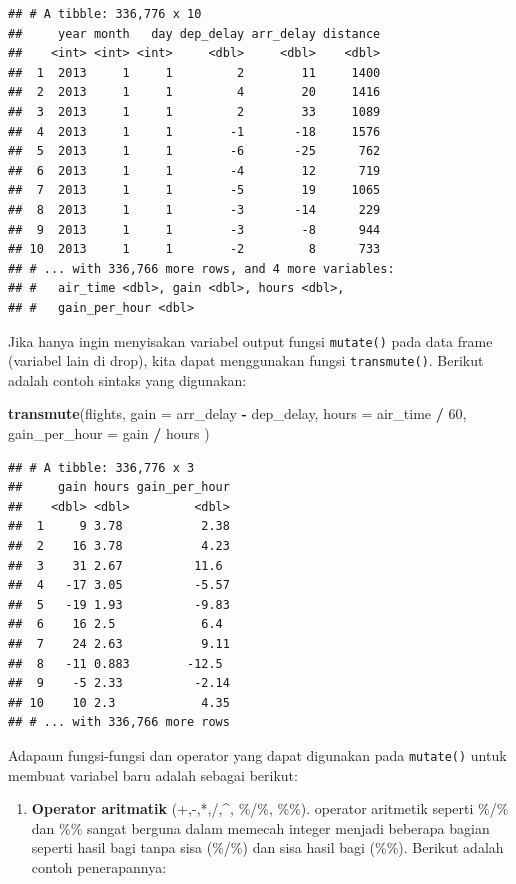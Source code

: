 \documentclass[]{book}
\newenvironment{Shaded}{\begin{snugshade}}{\end{snugshade}}
\newcommand{\KeywordTok}[1]{\textcolor[rgb]{0.13,0.29,0.53}{\textbf{#1}}}
\newcommand{\DataTypeTok}[1]{\textcolor[rgb]{0.13,0.29,0.53}{#1}}
\newcommand{\DecValTok}[1]{\textcolor[rgb]{0.00,0.00,0.81}{#1}}
\newcommand{\StringTok}[1]{\textcolor[rgb]{0.31,0.60,0.02}{#1}}
\newcommand{\OperatorTok}[1]{\textcolor[rgb]{0.81,0.36,0.00}{\textbf{#1}}}
\newcommand{\NormalTok}[1]{#1}
\providecommand{\tightlist}{%
  \setlength{\itemsep}{0pt}\setlength{\parskip}{0pt}}
\begin{document}
\begin{verbatim}
## # A tibble: 336,776 x 10
##     year month   day dep_delay arr_delay distance
##    <int> <int> <int>     <dbl>     <dbl>    <dbl>
##  1  2013     1     1         2        11     1400
##  2  2013     1     1         4        20     1416
##  3  2013     1     1         2        33     1089
##  4  2013     1     1        -1       -18     1576
##  5  2013     1     1        -6       -25      762
##  6  2013     1     1        -4        12      719
##  7  2013     1     1        -5        19     1065
##  8  2013     1     1        -3       -14      229
##  9  2013     1     1        -3        -8      944
## 10  2013     1     1        -2         8      733
## # ... with 336,766 more rows, and 4 more variables:
## #   air_time <dbl>, gain <dbl>, hours <dbl>,
## #   gain_per_hour <dbl>
\end{verbatim}

Jika hanya ingin menyisakan variabel output fungsi \texttt{mutate()}
pada data frame (variabel lain di drop), kita dapat menggunakan fungsi
\texttt{transmute()}. Berikut adalah contoh sintaks yang digunakan:

\begin{Shaded}
\begin{Highlighting}[]
\KeywordTok{transmute}\NormalTok{(flights,}
  \DataTypeTok{gain =}\NormalTok{ arr_delay }\OperatorTok{-}\StringTok{ }\NormalTok{dep_delay,}
  \DataTypeTok{hours =}\NormalTok{ air_time }\OperatorTok{/}\StringTok{ }\DecValTok{60}\NormalTok{,}
  \DataTypeTok{gain_per_hour =}\NormalTok{ gain }\OperatorTok{/}\StringTok{ }\NormalTok{hours}
\NormalTok{)}
\end{Highlighting}
\end{Shaded}

\begin{verbatim}
## # A tibble: 336,776 x 3
##     gain hours gain_per_hour
##    <dbl> <dbl>         <dbl>
##  1     9 3.78           2.38
##  2    16 3.78           4.23
##  3    31 2.67          11.6 
##  4   -17 3.05          -5.57
##  5   -19 1.93          -9.83
##  6    16 2.5            6.4 
##  7    24 2.63           9.11
##  8   -11 0.883        -12.5 
##  9    -5 2.33          -2.14
## 10    10 2.3            4.35
## # ... with 336,766 more rows
\end{verbatim}

Adapaun fungsi-fungsi dan operator yang dapat digunakan pada
\texttt{mutate()} untuk membuat variabel baru adalah sebagai berikut:

\begin{enumerate}
\def\labelenumi{\arabic{enumi}.}
\tightlist
\item
  \textbf{Operator aritmatik} (+,-,*,/,\^{}, \%/\%, \%\%). operator
  aritmetik seperti \%/\% dan \%\% sangat berguna dalam memecah integer
  menjadi beberapa bagian seperti hasil bagi tanpa sisa (\%/\%) dan sisa
  hasil bagi (\%\%). Berikut adalah contoh penerapannya:
\end{enumerate}
\end{document}
